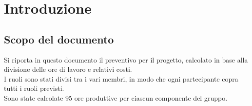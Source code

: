 \section{Introduzione}
\subsection{Scopo del documento}
Si riporta in questo documento il preventivo per il progetto, calcolato in base alla divisione delle ore di lavoro e relativi costi. \\
I ruoli sono stati divisi tra i vari membri, in modo che ogni partecipante copra tutti i ruoli previsti. \\
Sono state calcolate 95 ore produttive per ciascun componente del gruppo. \\
